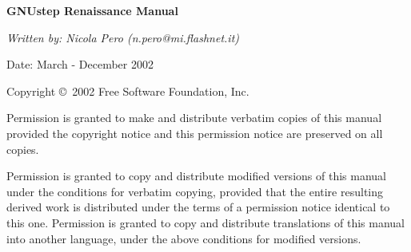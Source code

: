 %
%
%
\begin{titlepage}
\begin{flushleft}
{\phantom{begin page}}
\vskip6cm

{\LARGE\bf GNUstep Renaissance Manual\par}

\vskip1cm

{\sl Written by:  Nicola Pero (n.pero@mi.flashnet.it)

Date: March - December 2002}
\end{flushleft}

\vskip3cm

{\sc Copyright \copyright\ 2002 Free Software Foundation, Inc.}

Permission is granted to make and distribute verbatim copies of this
manual provided the copyright notice and this permission notice are
preserved on all copies.

Permission is granted to copy and distribute modified versions of this
manual under the conditions for verbatim copying, provided that the
entire resulting derived work is distributed under the terms of a
permission notice identical to this one.  Permission is granted to
copy and distribute translations of this manual into another language,
under the above conditions for modified versions.

\end{titlepage}





